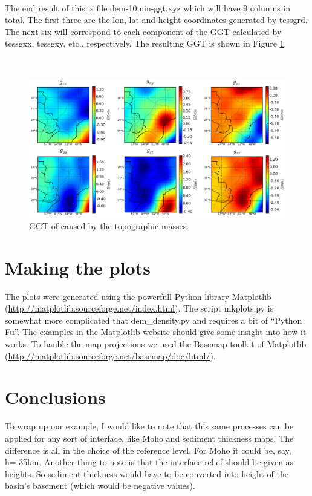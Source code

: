 \documentclass[a4paper]{article}
\begin{document}


\hfill\\
\noindent The end result of this is file dem-10min-ggt.xyz which will have 9 columns in total.
The first three are the lon, lat and height coordinates generated by tessgrd.
The next six will correspond to each component of the GGT calculated by tessgxx, tessgxy, etc.,
respectively. The resulting GGT is shown in Figure \ref{fig:dem-ggt}.


\hfill\\

\begin{figure}[htb]
    \centering
        \includegraphics[width=\textwidth]{dem-10min-ggt.png}
    \caption{GGT of caused by the topographic masses.
    \label{fig:dem-ggt}}
\end{figure}

\section{Making the plots}

The plots were generated using the powerfull Python library Matplotlib
(\url{http://matplotlib.sourceforge.net/index.html}).
The script mkplots.py is somewhat more complicated that dem\_density.py and requires
a bit of ``Python Fu''. The examples in the Matplotlib website should give some
insight into how it works.
To hanble the map projections we used the Basemap toolkit of Matplotlib
(\url{http://matplotlib.sourceforge.net/basemap/doc/html/}).

\section{Conclusions}

To wrap up our example, I would like to note that this same processes can be applied
for any sort of interface, like Moho and sediment thickness maps. The difference is
all in the choice of the reference level. For Moho it could be, say, h=-35km.
Another thing to note is that the interface relief should be given as heights.
So sediment thickness would have to be converted into height of the basin's  basement
(which would be negative values).
\end{document}
